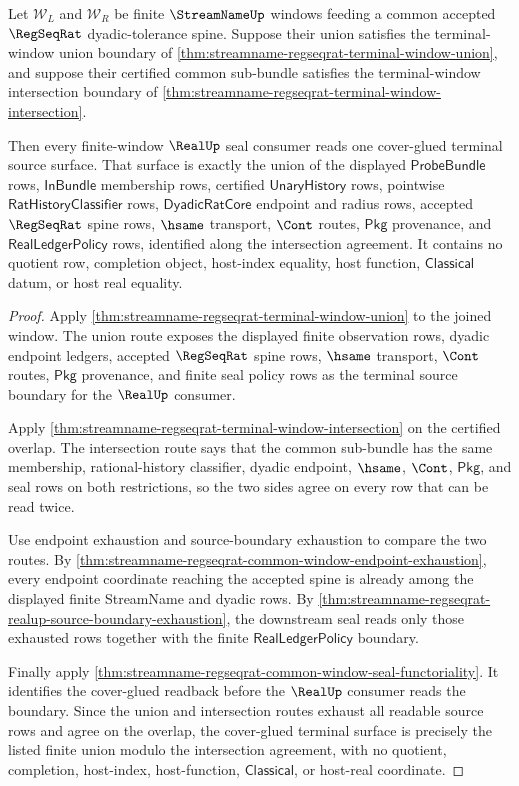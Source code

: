 \begin{theorem}
\label{thm:streamname-regseqrat-terminal-window-cover-gluing}
Let $\mathcal W_L$ and $\mathcal W_R$ be finite $\StreamNameUp$ windows feeding
a common accepted $\RegSeqRat$ dyadic-tolerance spine. Suppose their union
satisfies the terminal-window union boundary of
\autoref{thm:streamname-regseqrat-terminal-window-union}, and suppose their
certified common sub-bundle satisfies the terminal-window intersection boundary
of \autoref{thm:streamname-regseqrat-terminal-window-intersection}.

Then every finite-window $\RealUp$ seal consumer reads one cover-glued terminal
source surface. That surface is exactly the union of the displayed
$\mathsf{ProbeBundle}$ rows, $\mathsf{InBundle}$ membership rows, certified
$\mathsf{UnaryHistory}$ rows, pointwise $\mathsf{RatHistoryClassifier}$ rows,
$\mathsf{DyadicRatCore}$ endpoint and radius rows, accepted $\RegSeqRat$ spine
rows, $\hsame$ transport, $\Cont$ routes, $\mathsf{Pkg}$ provenance, and
$\mathsf{RealLedgerPolicy}$ rows, identified along the intersection agreement.
It contains no quotient row, completion object, host-index equality, host
function, $\mathsf{Classical}$ datum, or host real equality.
\end{theorem}
\begin{proof}
Apply \autoref{thm:streamname-regseqrat-terminal-window-union} to the joined
window. The union route exposes the displayed finite observation rows, dyadic
endpoint ledgers, accepted $\RegSeqRat$ spine rows, $\hsame$ transport,
$\Cont$ routes, $\mathsf{Pkg}$ provenance, and finite seal policy rows as the
terminal source boundary for the $\RealUp$ consumer.

Apply \autoref{thm:streamname-regseqrat-terminal-window-intersection} on the
certified overlap. The intersection route says that the common sub-bundle has
the same membership, rational-history classifier, dyadic endpoint, $\hsame$,
$\Cont$, $\mathsf{Pkg}$, and seal rows on both restrictions, so the two sides
agree on every row that can be read twice.

Use endpoint exhaustion and source-boundary exhaustion to compare the two
routes. By
\autoref{thm:streamname-regseqrat-common-window-endpoint-exhaustion}, every
endpoint coordinate reaching the accepted spine is already among the displayed
finite StreamName and dyadic rows. By
\autoref{thm:streamname-regseqrat-realup-source-boundary-exhaustion}, the
downstream seal reads only those exhausted rows together with the finite
$\mathsf{RealLedgerPolicy}$ boundary.

Finally apply
\autoref{thm:streamname-regseqrat-common-window-seal-functoriality}. It
identifies the cover-glued readback before the $\RealUp$ consumer reads the
boundary. Since the union and intersection routes exhaust all readable source
rows and agree on the overlap, the cover-glued terminal surface is precisely
the listed finite union modulo the intersection agreement, with no quotient,
completion, host-index, host-function, $\mathsf{Classical}$, or host-real
coordinate.
\end{proof}

